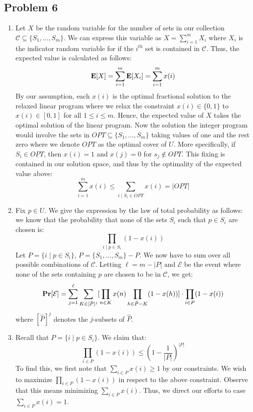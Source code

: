 \documentclass[12pt]{article}%
\begin{document}
\subsection*{Problem 6}
\begin{enumerate}
  \item Let $X$ be the random variable for the number of sets in our collection $\mathcal{C} \subseteq \{S_1,...,S_m\}$. We can express this variable as $X = \sum_{i=1}^m X_i$ where $X_i$ is the indicator random variable for if the $i^{th}$ set is contained in $\mathcal{C}$. Thus, the expected value is calculated as follows:
  $${\bf E}[X] = \sum_{i=1}^{m}{\bf E}[X_i] = \sum_{i=1}^{m} x(i) $$
  By our assumption, each $x(i)$ is the optimal fractional solution to the relaxed linear program where we relax the constraint $x(i) \in \{0,1\}$ to $x(i) \in [0,1]$ for all $1 \leq i \leq m$. Hence, the expected value of $X$ takes the optimal solution of the linear program. Now the solution the integer program would involve the sets in $OPT \subseteq \{S_1,...,S_m\}$ taking values of one and the rest zero where we denote $OPT$ as the optimal cover of $U$. More specifically, if $S_i \in OPT$, then $x(i) = 1$ and $x(j) = 0$ for $s_j \not\in OPT$. This fixing is contained in our solution space, and thus by the optimality of the expected value above:
  $$\sum_{i=1}^{m} x(i) \leq \sum_{i \mid S_i \in OPT} x(i) = |OPT| $$

  \item Fix $p \in U$. We give the expression by the law of total probability as follows: we know that the probability that none of the sets $S_i$ such that $p \in S_i$ are chosen is:
  $$ \prod_{i \mid p \in S_i} (1-x(i))$$
  Let $P = \{i \mid p \in S_i\}$, ${\hat P} = \{S_1,...,S_m\} - P$. We now have to sum over all possible combinations of $\mathcal{C}$. Letting $\ell = m - |P|$ and $\mathcal{E}$ be the event where none of the sets containing $p$ are chosen to be in $\mathcal{C}$, we get:
  $${\bf Pr}[\mathcal{E}] = \sum_{j=1}^{\ell}\sum_{K \in [{\hat P}]^j}[\prod_{n \in K}x(n)\prod_{h \in {\hat P} - K} (1-x(h))] \cdot \prod_{i \in P} (1-x(i)) $$
  where $[{\hat P}]^j$ denotes the $j$-subsets of ${\hat P}$.

  \item Recall that $P = \{i \mid p \in S_i\}$. We claim that:
  $$\prod_{i \in P} (1-x(i)) \leq (1 - \frac{1}{|P|})^{|P|} $$
  To find this, we first note that $\sum_{i \in P} x(i) \geq 1$ by our constraints. We wish to maximize $\prod_{i \in P} (1-x(i))$ in respect to the above constraint. Observe that this means minimizing $\sum_{i \in P} x(i)$. Thus, we direct our efforts to case $\sum_{i \in P} x(i) = 1$. \newline


\end{enumerate}
\end{document}
